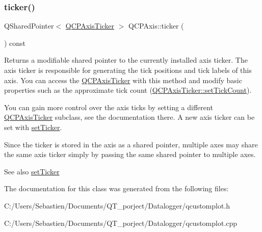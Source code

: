 \subsubsection{\texorpdfstring{ticker()}{ticker()}}
{\footnotesize\ttfamily Q\+Shared\+Pointer$<$ \hyperlink{class_q_c_p_axis_ticker}{Q\+C\+P\+Axis\+Ticker} $>$ Q\+C\+P\+Axis\+::ticker (\begin{DoxyParamCaption}{ }\end{DoxyParamCaption}) const\hspace{0.3cm}{\ttfamily [inline]}}

Returns a modifiable shared pointer to the currently installed axis ticker. The axis ticker is responsible for generating the tick positions and tick labels of this axis. You can access the \hyperlink{class_q_c_p_axis_ticker}{Q\+C\+P\+Axis\+Ticker} with this method and modify basic properties such as the approximate tick count (\hyperlink{class_q_c_p_axis_ticker_a47752abba8293e6dc18491501ae34008}{Q\+C\+P\+Axis\+Ticker\+::set\+Tick\+Count}).

You can gain more control over the axis ticks by setting a different \hyperlink{class_q_c_p_axis_ticker}{Q\+C\+P\+Axis\+Ticker} subclass, see the documentation there. A new axis ticker can be set with \hyperlink{class_q_c_p_axis_a4ee03fcd2c74d05cd1a419b9af5cfbdc}{set\+Ticker}.

Since the ticker is stored in the axis as a shared pointer, multiple axes may share the same axis ticker simply by passing the same shared pointer to multiple axes.

\begin{DoxySeeAlso}{See also}
\hyperlink{class_q_c_p_axis_a4ee03fcd2c74d05cd1a419b9af5cfbdc}{set\+Ticker} 
\end{DoxySeeAlso}


The documentation for this class was generated from the following files\+:\begin{DoxyCompactItemize}
\item 
C\+:/\+Users/\+Sebastien/\+Documents/\+Q\+T\+\_\+porject/\+Datalogger/qcustomplot.\+h\item 
C\+:/\+Users/\+Sebastien/\+Documents/\+Q\+T\+\_\+porject/\+Datalogger/qcustomplot.\+cpp\end{DoxyCompactItemize}
